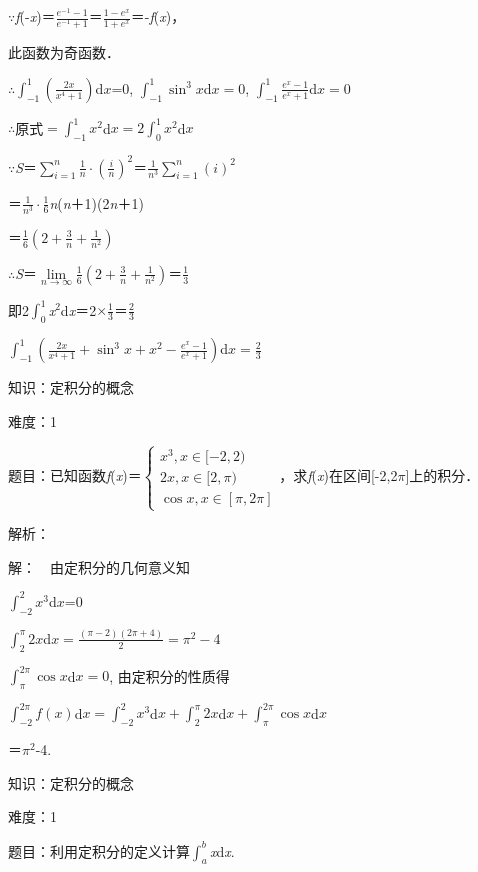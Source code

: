 \documentclass{article} %
\begin{document}
$\mathrm{\because}$\textit{f}(-\textit{x})＝$\frac{e^{-1}-1}{e^{-1}+1}$＝$\frac{1-e^x}{1+e^x}$＝-\textit{f}(\textit{x})，

此函数为奇函数．

$\therefore\int_{-1}^{1}(\frac{2x}{x^4+1})$d$x$=0, $\int_{-1}^{1}\sin^3x$d$x=0$, $\int_{-1}^{1}\frac{e^x-1}{e^x+1}$d$x=0$

$\therefore$原式$=\int_{-1}^{1}x^2$d$x=2\int_0^1x^2$d$x$

$\mathrm{\because}$\textit{S}＝$\sum\limits_{i=1}^{n}\frac{1}{n}\cdot(\frac{i}{n})^2$＝$\frac{1}{n^3}\sum\limits_{i=1}^{n}(i)^2$

＝$\frac{1}{n^3}\cdot\frac{1}{6}$\textit{n}(\textit{n}＋1)(2\textit{n}＋1)

＝$\frac{1}{6}(2+\frac{3}{n}+\frac{1}{n^2})$

$\mathrm{\therefore}$\textit{S}＝$\lim\limits_{n\rightarrow \infty}\frac{1}{6}(2+\frac{3}{n}+\frac{1}{n^2})$＝$\frac{1}{3}$

即2$\int_{0}^{1}$\textit{x}${}^{2}$d\textit{x}＝2$\mathrm{\times}\frac{1}{3}$＝$\frac{2}{3}$

$\int_{-1}^{1}(\frac{2x}{x^4+1}+\sin^3x+x^2-\frac{e^x-1}{e^x+1})$d$x=\frac{2}{3}$



 知识：定积分的概念

 难度：1

 题目：已知函数\textit{f}(\textit{x})＝$\left\{\begin{array}{l} x^3, x\in [-2, 2)\\ 2x, x\in[2, \pi)\\ \cos x, x\in[\pi, 2\pi] \end{array}\right.$，求\textit{f}(\textit{x})在区间[-2,2$\pi$]上的积分．

 解析：

 解：　由定积分的几何意义知

$\int_{-2}^{2}x^3$d$x$=0

$\int_{2}^{\pi}2x$d$x=\frac{(\pi-2)(2\pi+4)}{2}=\pi^2-4$

$\int_{\pi}^{2\pi}\cos x$d$x=0$, 由定积分的性质得

$\int_{-2}^{2\pi}f(x)$d$x=\int_{-2}^{2}x^3$d$x+\int_{2}^\pi 2x$d$x+\int_{\pi}^{2\pi}\cos x$d$x$

＝$\pi$${}^{2}$-4.

 

 知识：定积分的概念

 难度：1

 题目：利用定积分的定义计算$\int_a^b$\textit{x}d\textit{x}.
\end{document}
